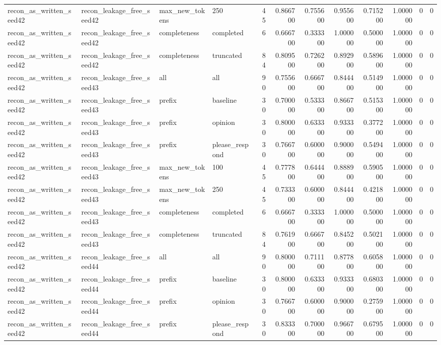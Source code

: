 \begin{tabular}{llllrrrrrrrr}
recon_as_written_seed42 & recon_leakage_free_seed42 & max_new_tokens & 250 & 45 & 0.866700 & 0.755600 & 0.955600 & 0.715200 & 1.000000 & 0 & 0 \\
recon_as_written_seed42 & recon_leakage_free_seed42 & completeness & completed & 6 & 0.666700 & 0.333300 & 1.000000 & 0.500000 & 1.000000 & 0 & 0 \\
recon_as_written_seed42 & recon_leakage_free_seed42 & completeness & truncated & 84 & 0.809500 & 0.726200 & 0.892900 & 0.589600 & 1.000000 & 0 & 0 \\
recon_as_written_seed42 & recon_leakage_free_seed43 & all & all & 90 & 0.755600 & 0.666700 & 0.844400 & 0.514900 & 1.000000 & 0 & 0 \\
recon_as_written_seed42 & recon_leakage_free_seed43 & prefix & baseline & 30 & 0.700000 & 0.533300 & 0.866700 & 0.515300 & 1.000000 & 0 & 0 \\
recon_as_written_seed42 & recon_leakage_free_seed43 & prefix & opinion & 30 & 0.800000 & 0.633300 & 0.933300 & 0.377200 & 1.000000 & 0 & 0 \\
recon_as_written_seed42 & recon_leakage_free_seed43 & prefix & please_respond & 30 & 0.766700 & 0.600000 & 0.900000 & 0.549400 & 1.000000 & 0 & 0 \\
recon_as_written_seed42 & recon_leakage_free_seed43 & max_new_tokens & 100 & 45 & 0.777800 & 0.644400 & 0.888900 & 0.590500 & 1.000000 & 0 & 0 \\
recon_as_written_seed42 & recon_leakage_free_seed43 & max_new_tokens & 250 & 45 & 0.733300 & 0.600000 & 0.844400 & 0.421800 & 1.000000 & 0 & 0 \\
recon_as_written_seed42 & recon_leakage_free_seed43 & completeness & completed & 6 & 0.666700 & 0.333300 & 1.000000 & 0.500000 & 1.000000 & 0 & 0 \\
recon_as_written_seed42 & recon_leakage_free_seed43 & completeness & truncated & 84 & 0.761900 & 0.666700 & 0.845200 & 0.502100 & 1.000000 & 0 & 0 \\
recon_as_written_seed42 & recon_leakage_free_seed44 & all & all & 90 & 0.800000 & 0.711100 & 0.877800 & 0.605800 & 1.000000 & 0 & 0 \\
recon_as_written_seed42 & recon_leakage_free_seed44 & prefix & baseline & 30 & 0.800000 & 0.633300 & 0.933300 & 0.680300 & 1.000000 & 0 & 0 \\
recon_as_written_seed42 & recon_leakage_free_seed44 & prefix & opinion & 30 & 0.766700 & 0.600000 & 0.900000 & 0.275900 & 1.000000 & 0 & 0 \\
recon_as_written_seed42 & recon_leakage_free_seed44 & prefix & please_respond & 30 & 0.833300 & 0.700000 & 0.966700 & 0.679500 & 1.000000 & 0 & 0 \\

\end{tabular}
